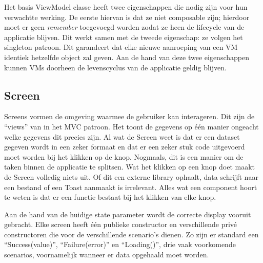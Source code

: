 \documentclass{report}
\begin{document}
Het basis ViewModel classe heeft twee eigenschappen die nodig zijn voor hun verwachtte werking.
De eerste hiervan is dat ze niet composable zijn; hierdoor moet er geen \textit{remember} toegevoegd worden zodat ze heen de lifecycle van de applicatie blijven.
Dit werkt samen met de tweede eigenschap: ze volgen het singleton patroon. Dit garandeert dat elke nieuwe aanroeping van een VM identiek hetzelfde object zal geven.
Aan de hand van deze twee eigenschappen kunnen VMs doorheen de levenscyclus van de applicatie geldig blijven.




\subsection{Screen}
Screens vormen de omgeving waarmee de gebruiker kan interageren. Dit zijn de ``views'' van in het MVC patroon.
Het toont de gegevens op één manier ongeacht welke gegevens dit precies zijn. 
Al wat de Screen weet is dat er een dataset gegeven wordt in een zeker formaat en dat er een zeker stuk code uitgevoerd moet worden bij het klikken op de knop.
Nogmaals, dit is een manier om de taken binnen de applicatie te splitsen. Wat het klikken op een knop doet maakt de Screen volledig niets uit. Of dit een externe library ophaalt, data schrijft naar een bestand of een Toast aanmaakt is irrelevant.
Alles wat een component hoort te weten is dat er een functie bestaat bij het klikken van elke knop.

Aan de hand van de huidige state parameter wordt de correcte display vooruit gebracht.
Elke screen heeft één publieke constructor en verschillende privé constructoren die voor de verschillende scenario's dienen.
Zo zijn er standard een ``Success(value)'', ``Failure(error)'' en ``Loading()'', drie vaak voorkomende scenarios, voornamelijk wanneer er data opgehaald moet worden.
\end{document}
